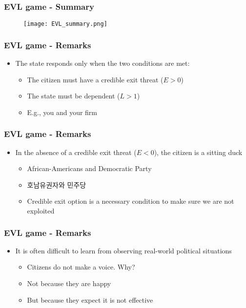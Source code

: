 \documentclass[xcolor=pdftex,dvipsnames]{beamer}
\begin{document}
\begin{frame}
\frametitle{EVL game - Summary}
\begin{figure}
\begin{center}
  \texttt{[image: EVL\_summary.png]}\\
\end{center}
\end{figure}
\end{frame}

\begin{frame}
\frametitle{EVL game - Remarks}
\begin{itemize}
\item The state responds only when the two conditions are met:
\begin{itemize}
\item The citizen must have a credible exit threat ($E>0$)
\item The state must be dependent ($L>1$)
\item E.g., you and your firm
\end{itemize}
\end{itemize}
\end{frame}

\begin{frame}
\frametitle{EVL game - Remarks}
\begin{itemize}
\item In the absence of a credible exit threat ($E<0$), the citizen is a sitting duck
\begin{itemize}
\item African-Americans and Democratic Party 
\item 호남유권자와 민주당
\item Credible exit option is a necessary condition to make sure we are not exploited
\end{itemize}
\end{itemize}
\end{frame}

\begin{frame}
\frametitle{EVL game - Remarks}
\begin{itemize}
\item It is often difficult to learn from observing real-world political situations
\begin{itemize}
\item Citizens do not make a voice. Why? 
\item Not because they are happy
\item But because they expect it is not effective
\end{itemize}
\end{itemize}
\end{frame}
\end{document}
